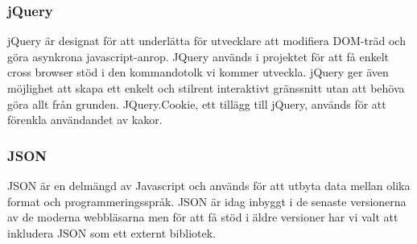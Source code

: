 \subsubsection{jQuery} 
jQuery är designat för att underlätta för utvecklare att modifiera DOM-träd och göra asynkrona javascript-anrop. JQuery används i projektet för att få enkelt cross browser stöd i den kommandotolk vi kommer utveckla. 
jQuery ger även möjlighet att skapa ett enkelt och stilrent interaktivt gränssnitt utan att behöva göra allt från grunden.
JQuery.Cookie, ett tillägg till jQuery, används för att förenkla användandet av kakor.

\subsubsection{JSON}
JSON \citep{json}  är en delmängd av Javascript och används för att utbyta data mellan olika format och programmeringsspråk. 
JSON är idag inbyggt i de senaste versionerna av de moderna webbläsarna men för att få stöd i äldre versioner har vi valt att inkludera JSON som ett externt bibliotek.

